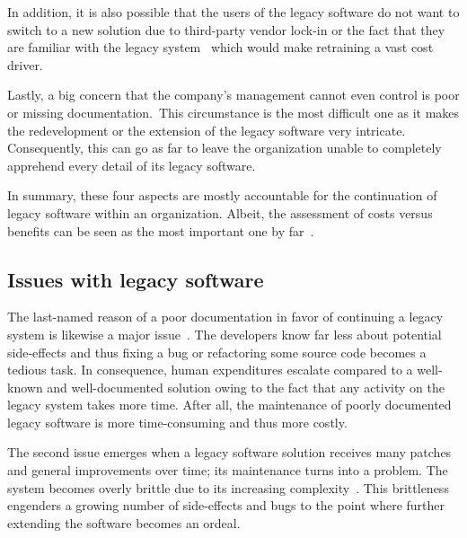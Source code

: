 \documentclass[12pt,a4paper]{report}
\begin{document}
In addition, it is also possible that the users of the legacy software do not want
to switch to a new solution due to third-party vendor lock-in or the fact that
they are familiar with the legacy system~\cite{bennett-coping-legacy} which would make
retraining a vast cost driver.

Lastly, a big concern that the company's management cannot even control is
poor or missing documentation.~\cn This circumstance is the most difficult one
as it makes the redevelopment or the extension of the legacy software very intricate.
Consequently, this can go as far to leave the organization unable to completely apprehend
every detail of its legacy software.

In summary, these four aspects are mostly accountable for the continuation of legacy software
within an organization. Albeit, the assessment of costs versus benefits
can be seen as the most important one by far~\cite{schneidewind-preserve-or-redesign}.


\subsection{Issues with legacy software} \label{issues-legacy-software}

The last-named reason of a poor documentation in favor of continuing a
legacy system is likewise a major issue~\cite{bisbal-legacy-issues}.
The developers know far less about potential side-effects and thus
fixing a bug or refactoring some source code becomes a tedious task.
In consequence, human expenditures escalate compared to a well-known and well-documented
solution owing to the fact that any activity on the legacy system takes more time.
After all, the maintenance of poorly documented legacy software
is more time-consuming and thus more costly.

The second issue emerges when a legacy software solution receives many
patches and general improvements over time; its maintenance
turns into a problem. The system becomes overly brittle due to its
increasing complexity~\cite{seacord-modernizing-legacy, tilley-perspectives-reengineering}.
This brittleness engenders a growing number of side-effects and bugs
to the point where further extending the software becomes an ordeal.
\end{document}

